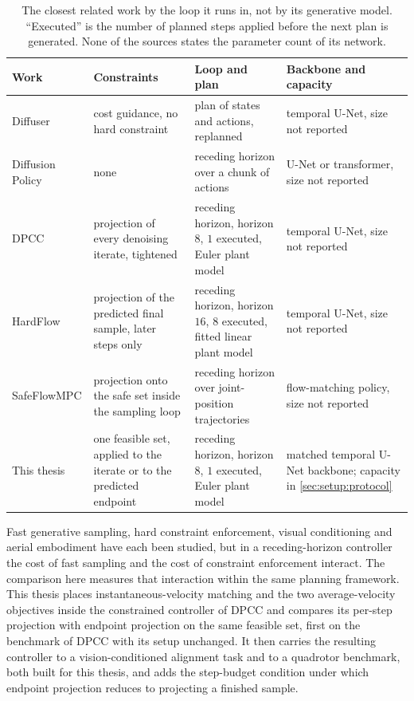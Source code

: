 \begin{table}[htpb]
  \caption[Planner, loop and constraint mechanism in the closest related work]{The closest related
  work by the loop it runs in, not by its generative model. ``Executed'' is the number of planned
  steps applied before the next plan is generated. None of the sources states the parameter count of
  its network.}
  \label{tab:related-loops}
  \centering\small
  \begin{tabularx}{\linewidth}{lLLL}
    \toprule
    Work & Constraints & Loop and plan & Backbone and capacity \\
    \midrule
    Diffuser \parencite{janner2022planning}
      & cost guidance, no hard constraint
      & plan of states and actions, replanned
      & temporal U-Net, size not reported \\
    Diffusion Policy \parencite{chi2023diffusion}
      & none
      & receding horizon over a chunk of actions
      & U-Net or transformer, size not reported \\
    \ac{DPCC} \parencite{romer2025diffusion}
      & projection of every denoising iterate, tightened
      & receding horizon, horizon $8$, $1$ executed, Euler plant model
      & temporal U-Net, size not reported \\
    HardFlow \parencite{li2025hardflow}
      & projection of the predicted final sample, later steps only
      & receding horizon, horizon $16$, $8$ executed, fitted linear plant model
      & temporal U-Net, size not reported \\
    SafeFlowMPC \parencite{oelerich2026safeflowmpc}
      & projection onto the safe set inside the sampling loop
      & receding horizon over joint-position trajectories
      & flow-matching policy, size not reported \\
    This thesis
      & one feasible set, applied to the iterate or to the predicted endpoint
      & receding horizon, horizon $8$, $1$ executed, Euler plant model
      & matched temporal U-Net backbone; capacity in \autoref{sec:setup:protocol} \\
    \bottomrule
  \end{tabularx}
\end{table}

Fast generative sampling, hard constraint enforcement, visual conditioning and aerial embodiment have
each been studied, but in a receding-horizon controller the cost of fast sampling and the cost of
constraint enforcement interact. The comparison here measures that interaction within the same
planning framework.
This thesis places instantaneous-velocity matching and the two average-velocity objectives inside the
constrained controller
of \ac{DPCC} and compares its per-step projection with endpoint projection \parencite{li2025hardflow}
on the same feasible set, first on the benchmark of \ac{DPCC} with its setup unchanged. It then carries
the resulting controller to a vision-conditioned alignment task and to a quadrotor benchmark, both built
for this thesis, and adds the step-budget condition under which endpoint projection reduces to
projecting a finished sample.
